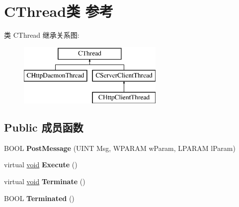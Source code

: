 \hypertarget{class_c_thread}{}\section{C\+Thread类 参考}
\label{class_c_thread}
类 C\+Thread 继承关系图\+:\begin{figure}[H]
\begin{center}
\leavevmode
\includegraphics[height=3.000000cm]{class_c_thread}
\end{center}
\end{figure}
\subsection*{Public 成员函数}
\begin{DoxyCompactItemize}
\item 
\mbox{\label{class_c_thread_a67933c2397ef97f226a29486e5e1a7a6}} 
B\+O\+OL {\bfseries Post\+Message} (U\+I\+NT Msg, W\+P\+A\+R\+AM w\+Param, L\+P\+A\+R\+AM l\+Param)
\item 
\mbox{\label{class_c_thread_a3b30f1d95d808405d17880c67fc84c75}} 
virtual \hyperlink{interfacevoid}{void} {\bfseries Execute} ()
\item 
\mbox{\label{class_c_thread_aa4d21bbf393e1638b6a0351f0f92ec24}} 
virtual \hyperlink{interfacevoid}{void} {\bfseries Terminate} ()
\item 
\mbox{\label{class_c_thread_adeb17e82ab50d338533eb9185fe75871}} 
B\+O\+OL {\bfseries Terminated} ()
\end{DoxyCompactItemize}

